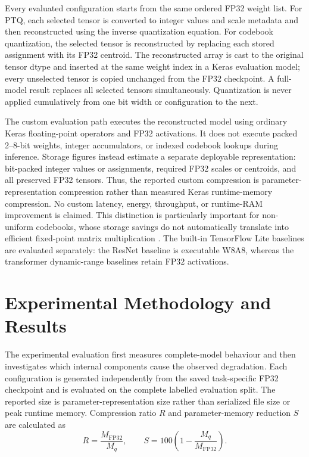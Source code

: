 \documentclass[conference]{IEEEtran}
\begin{document}
Every evaluated configuration starts from the same ordered FP32 weight list. For PTQ, each selected tensor is converted to integer values and scale metadata and then reconstructed using the inverse quantization equation. For codebook quantization, the selected tensor is reconstructed by replacing each stored assignment with its FP32 centroid. The reconstructed array is cast to the original tensor dtype and inserted at the same weight index in a Keras evaluation model; every unselected tensor is copied unchanged from the FP32 checkpoint. A full-model result replaces all selected tensors simultaneously. Quantization is never applied cumulatively from one bit width or configuration to the next.

The custom evaluation path executes the reconstructed model using ordinary Keras floating-point operators and FP32 activations. It does not execute packed 2--8-bit weights, integer accumulators, or indexed codebook lookups during inference. Storage figures instead estimate a separate deployable representation: bit-packed integer values or assignments, required FP32 scales or centroids, and all preserved FP32 tensors. Thus, the reported custom compression is parameter-representation compression rather than measured Keras runtime-memory compression. No custom latency, energy, throughput, or runtime-RAM improvement is claimed. This distinction is particularly important for non-uniform codebooks, whose storage savings do not automatically translate into efficient fixed-point matrix multiplication \cite{abushahla2025}. The built-in TensorFlow Lite baselines are evaluated separately: the ResNet baseline is executable W8A8, whereas the transformer dynamic-range baselines retain FP32 activations.

\section{Experimental Methodology and Results}
\label{sec:methodology-results}

The experimental evaluation first measures complete-model behaviour and then investigates which internal components cause the observed degradation. Each configuration is generated independently from the saved task-specific FP32 checkpoint and is evaluated on the complete labelled evaluation split. The reported size is parameter-representation size rather than serialized file size or peak runtime memory. Compression ratio $R$ and parameter-memory reduction $S$ are calculated as
\begin{equation}
R=\frac{M_{\mathrm{FP32}}}{M_q}, \qquad
S=100\left(1-\frac{M_q}{M_{\mathrm{FP32}}}\right).
\end{equation}
\end{document}
